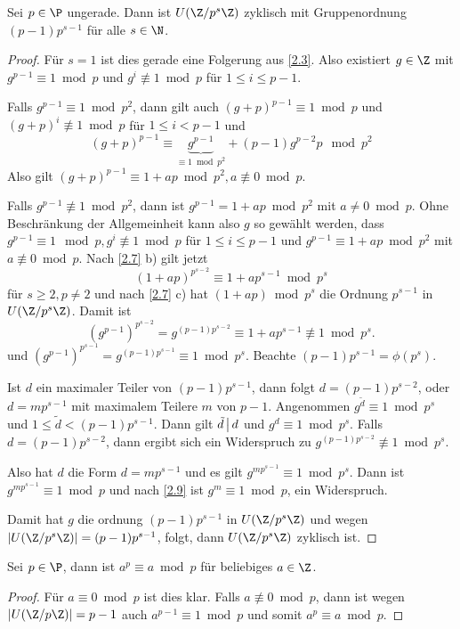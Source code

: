 \begin{st} \label{2.8}
	Sei $p \in \P$ ungerade.
	Dann ist $U(\Z / p^s \Z)$ zyklisch mit Gruppenordnung $(p-1)p^{s-1}$ für alle $s \in \N$.
	\begin{proof}
		Für $s = 1$ ist dies gerade eine Folgerung aus \ref{2.3}.
		Also existiert $g \in \Z$ mit $g^{p-1} \equiv 1 \bmod p$ und $g^i \not\equiv 1 \bmod p$ für $1 \le i \le p -1$.

		Falls $g^{p-1} \equiv 1 \bmod p^2$, dann gilt auch $(g + p)^{p-1} \equiv 1 \bmod p$ und $(g + p)^i \not\equiv 1 \bmod p$ für $1 \le i < p-1$ und
		\[
			(g + p)^{p - 1} \equiv \underbrace{g^{p-1}}_{\equiv 1 \bmod p^2} + (p-1)g^{p-2} p \mod p^2
		\]
		Also gilt $(g + p)^{p-1} \equiv 1 + ap \bmod p^2, a \not\equiv 0 \bmod p$.

		Falls $g^{p-1} \not\equiv 1 \bmod p^2$, dann ist $g^{p-1} = 1 + ap \bmod p^2$ mit $a \neq 0 \bmod p$.
		Ohne Beschränkung der Allgemeinheit kann also $g$ so gewählt werden, dass $g^{p-1} \equiv 1 \mod p, g^i \not\equiv 1 \bmod p$ für $1 \le i \le p-1$ und $g^{p-1} \equiv 1 + ap \bmod p^2$ mit $a \not\equiv 0 \bmod p$.
		Nach \ref{2.7} b) gilt jetzt
		\[
			(1 + ap)^{p^{s-2}} \equiv 1 + ap^{s-1} \bmod p^s
		\]
		für $s \ge 2, p \neq 2$ und nach \ref{2.7} c) hat $(1 + ap) \bmod p^s$ die Ordnung $p^{s-1}$ in $U(\Z / p^s \Z)$.
		Damit ist
		\[
			(g^{p-1})^{p^{s-2}}
			= g^{(p-1)p^{s-2}}
			\equiv 1 + ap^{s-1}
			\not\equiv 1 \bmod p^s.
		\]
		und $(g^{p-1})^{p^{s-1}} = g^{(p-1)p^{s-1}} \equiv 1 \bmod p^s$.
		Beachte $(p-1)p^{s-1} = \phi(p^s)$.

		Ist $d$ ein maximaler Teiler von $(p-1)p^{s-1}$, dann folgt $d = (p-1)p^{s-2}$, oder $d = m p^{s-1}$ mit maximalem Teilere $m$ von $p-1$.
		Angenommen $g^{\tilde d} \equiv 1 \bmod p^s$ und $1 \le \tilde d < (p-1)p^{s-1}$.
		Dann gilt $\tilde d \divs d$ und $g^d \equiv 1 \bmod p^s$.
		Falls $d = (p-1)p^{s-2}$, dann ergibt sich ein Widerspruch zu $g^{(p-1)p^{s-2}} \not\equiv 1 \bmod p^s$.

		Also hat $d$ die Form $d = mp^{s-1}$ und es gilt $g^{mp^{s-1}} \equiv 1 \bmod p^s$.
		Dann ist $g^{mp^{s-1}} \equiv 1 \bmod p$ und nach \ref{2.9} ist $g^m \equiv 1 \bmod p$, ein Widerspruch.

		Damit hat $g$ die ordnung $(p-1)p^{s-1}$ in $U(\Z / p^s \Z)$ und wegen $|U(\Z / p^s \Z)| = (p-1)p^{s-1}$, folgt, dann $U(\Z / p^s \Z)$ zyklisch ist.
	\end{proof}
\end{st}

\begin{lem} \label{2.9}
	Sei $p \in \P$, dann ist $a^p \equiv a \bmod p$ für beliebiges $a \in \Z$.
	\begin{proof}
		Für $a \equiv 0 \bmod p$ ist dies klar.
		Falls $a \not\equiv 0 \bmod p$, dann ist wegen $|U(\Z / p\Z)| = p - 1$ auch $a^{p-1} \equiv 1 \bmod p$ und somit $a^p \equiv a \bmod p$.
	\end{proof}
\end{lem}

